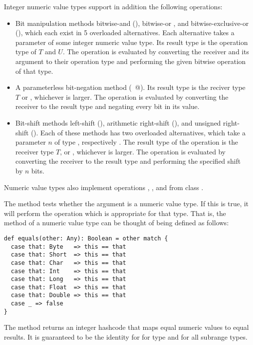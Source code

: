 Integer numeric value types support in addition the following operations:
\begin{itemize}
\item 
Bit manipulation methods bitwise-and (\code{&}), bitwise-or
{\code{|}}, and bitwise-exclusive-or (\code{^}), which each exist in 5
overloaded alternatives. Each alternative takes a parameter of some
integer numeric value type. Its result type is the operation type of
$T$ and $U$. The operation is evaluated by converting the receiver and
its argument to their operation type and performing the given bitwise
operation of that type.
\item
A parameterless bit-negation method (\lstinline@~@). Its result type is
the reciver type $T$ or , whichever is larger.
The operation is evaluated by converting the receiver to the result
type and negating every bit in its value.
\item
Bit-shift methods left-shift (\code{<<}), arithmetic right-shift
(\code{>>}), and unsigned right-shift (\code{>>>}). Each of these
methods has two overloaded alternatives, which take a parameter $n$
of type , respectively . The result type of the
operation is the receiver type $T$, or , whichever is larger.
The operation is evaluated by converting the receiver to the result
type and performing the specified shift by $n$ bits.
\end{itemize}

Numeric value types also implement operations ,
, and  from class .

The  method tests whether the argument is a numeric value
type. If this is true, it will perform the \code{==} operation which
is appropriate for that type. That is, the  method of a
numeric value type can be thought of being defined as follows:
\begin{lstlisting}
def equals(other: Any): Boolean = other match {
  case that: Byte   => this == that
  case that: Short  => this == that
  case that: Char   => this == that
  case that: Int    => this == that
  case that: Long   => this == that
  case that: Float  => this == that
  case that: Double => this == that
  case _ => false
}
\end{lstlisting}
The  method returns an integer hashcode that maps equal
numeric values to equal results. It is guaranteed to be the identity for 
for type  and for all subrange types.

